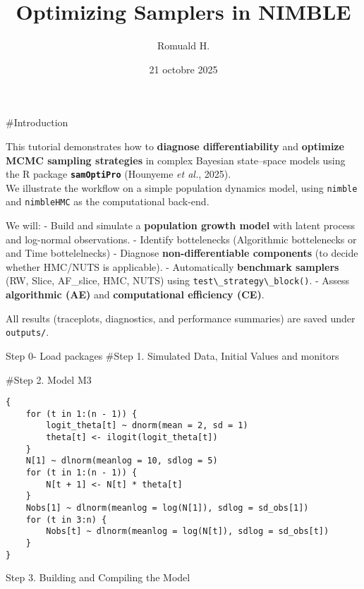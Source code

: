 \documentclass[
  10pt,
  ignorenonframetext,
  aspectratio=169]{beamer}
\title{Optimizing Samplers in NIMBLE}
\author{Romuald H.}
\date{21 octobre 2025}
\newcommand{\passthrough}[1]{#1}
\begin{document}
\frame{\titlepage}

\begin{frame}[fragile]
\#Introduction

This tutorial demonstrates how to \textbf{diagnose differentiability}
and \textbf{optimize MCMC sampling strategies} in complex Bayesian
state--space models using the R package
\textbf{\passthrough{\lstinline!samOptiPro!}} (Hounyeme \emph{et al.},
2025).\\
We illustrate the workflow on a simple population dynamics model, using
\passthrough{\lstinline!nimble!} and \passthrough{\lstinline!nimbleHMC!}
as the computational back-end.

We will: - Build and simulate a \textbf{population growth model} with
latent process and log-normal observations. - Identify bottelenecks
(Algorithmic bottelenecks or and Time bottelelnecks) - Diagnose
\textbf{non-differentiable components} (to decide whether HMC/NUTS is
applicable). - Automatically \textbf{benchmark samplers} (RW, Slice,
AF\_slice, HMC, NUTS) using
\passthrough{\lstinline!test\_strategy\_block()!}. - Assess
\textbf{algorithmic (AE)} and \textbf{computational efficiency (CE)}.

All results (traceplots, diagnostics, and performance summaries) are
saved under \passthrough{\lstinline!outputs/!}.
\end{frame}

\begin{frame}[fragile]{Step 0- Load packages}
\label{step-0--load-packages}
\#Step 1. Simulated Data, Initial Values and monitors

\#Step 2. Model M3

\begin{lstlisting}
{
    for (t in 1:(n - 1)) {
        logit_theta[t] ~ dnorm(mean = 2, sd = 1)
        theta[t] <- ilogit(logit_theta[t])
    }
    N[1] ~ dlnorm(meanlog = 10, sdlog = 5)
    for (t in 1:(n - 1)) {
        N[t + 1] <- N[t] * theta[t]
    }
    Nobs[1] ~ dlnorm(meanlog = log(N[1]), sdlog = sd_obs[1])
    for (t in 3:n) {
        Nobs[t] ~ dlnorm(meanlog = log(N[t]), sdlog = sd_obs[t])
    }
}
\end{lstlisting}
\end{frame}

\begin{frame}{Step 3. Building and Compiling the Model}
\label{step-3.-building-and-compiling-the-model}
\end{frame}
\end{document}
